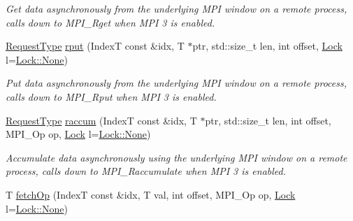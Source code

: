 \begin{DoxyCompactItemize}
\begin{DoxyCompactList}\small\item\em Get data asynchronously from the underlying M\+PI window on a remote process, calls down to {\ttfamily M\+P\+I\+\_\+\+Rget} when M\+PI 3 is enabled. \end{DoxyCompactList}\item 
\hyperlink{structvt_1_1rdma_1_1_base_typed_handle_a449c2c1948f5793c3fdfb1aba5801ed7}{Request\+Type} \hyperlink{structvt_1_1rdma_1_1_handle_3_01_t_00_01_e_00_01_index_t_00_01typename_01std_1_1enable__if__t_3_f66c3940d9f3649c3a5c3e77d63c658a_a71ab9bf9b26aa1db0d6d5cc7a712f3ce}{rput} (IndexT const \&idx, T $\ast$ptr, std\+::size\+\_\+t len, int offset, \hyperlink{namespacevt_1_1rdma_ac5c20b41a653e520b6305d4d454ecb70}{Lock} l=\hyperlink{namespacevt_1_1rdma_ac5c20b41a653e520b6305d4d454ecb70a6adf97f83acf6453d4a6a4b1070f3754}{Lock\+::\+None})
\begin{DoxyCompactList}\small\item\em Put data asynchronously from the underlying M\+PI window on a remote process, calls down to {\ttfamily M\+P\+I\+\_\+\+Rput} when M\+PI 3 is enabled. \end{DoxyCompactList}\item 
\hyperlink{structvt_1_1rdma_1_1_base_typed_handle_a449c2c1948f5793c3fdfb1aba5801ed7}{Request\+Type} \hyperlink{structvt_1_1rdma_1_1_handle_3_01_t_00_01_e_00_01_index_t_00_01typename_01std_1_1enable__if__t_3_f66c3940d9f3649c3a5c3e77d63c658a_a14e800f21489334ed91f3ad40412565d}{raccum} (IndexT const \&idx, T $\ast$ptr, std\+::size\+\_\+t len, int offset, M\+P\+I\+\_\+\+Op op, \hyperlink{namespacevt_1_1rdma_ac5c20b41a653e520b6305d4d454ecb70}{Lock} l=\hyperlink{namespacevt_1_1rdma_ac5c20b41a653e520b6305d4d454ecb70a6adf97f83acf6453d4a6a4b1070f3754}{Lock\+::\+None})
\begin{DoxyCompactList}\small\item\em Accumulate data asynchronously using the underlying M\+PI window on a remote process, calls down to {\ttfamily M\+P\+I\+\_\+\+Raccumulate} when M\+PI 3 is enabled. \end{DoxyCompactList}\item 
T \hyperlink{structvt_1_1rdma_1_1_handle_3_01_t_00_01_e_00_01_index_t_00_01typename_01std_1_1enable__if__t_3_f66c3940d9f3649c3a5c3e77d63c658a_add9aa1811c10aa54376a682f6c7be847}{fetch\+Op} (IndexT const \&idx, T val, int offset, M\+P\+I\+\_\+\+Op op, \hyperlink{namespacevt_1_1rdma_ac5c20b41a653e520b6305d4d454ecb70}{Lock} l=\hyperlink{namespacevt_1_1rdma_ac5c20b41a653e520b6305d4d454ecb70a6adf97f83acf6453d4a6a4b1070f3754}{Lock\+::\+None})

\end{DoxyCompactItemize}

